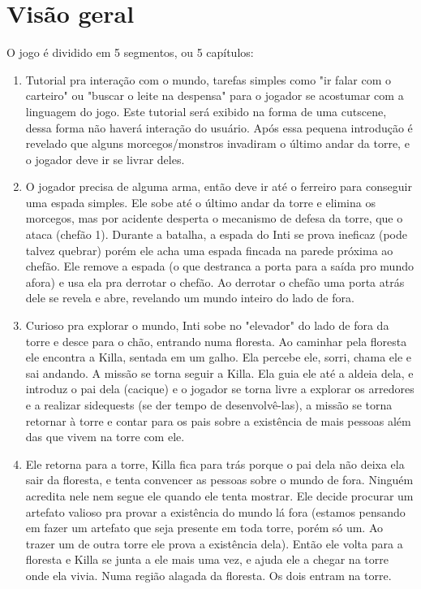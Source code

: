 \documentclass[12pt]{article}
\begin{document}
\section{Visão geral}
O jogo é dividido em 5 segmentos, ou 5 capítulos:
\begin{enumerate}
\item Tutorial pra interação com o mundo, tarefas simples como "ir falar com o
carteiro" ou "buscar o leite na despensa" para o jogador se acostumar com a
linguagem do jogo. Este tutorial será exibido na forma de uma cutscene, dessa
forma não haverá interação do usuário.
Após essa pequena introdução é revelado que alguns morcegos/monstros invadiram
o último andar da torre, e o jogador deve ir se livrar deles.

\item O jogador precisa de alguma arma, então deve ir até o ferreiro para
conseguir uma espada simples. Ele sobe até o último andar da torre e elimina os
morcegos, mas por acidente desperta o mecanismo de defesa da torre, que o ataca
(chefão 1).
Durante a batalha, a espada do Inti se prova ineficaz (pode talvez quebrar)
porém ele acha uma espada fincada na parede próxima ao chefão. Ele remove a
espada (o que destranca a porta para a saída pro mundo afora) e usa ela pra
derrotar o chefão.
Ao derrotar o chefão uma porta atrás dele se revela e abre, revelando um mundo
inteiro do lado de fora.

\item Curioso pra explorar o mundo, Inti sobe no "elevador" do lado de fora da
torre e desce para o chão, entrando numa floresta.
Ao caminhar pela floresta ele encontra a Killa, sentada em um galho. Ela percebe
ele, sorri, chama ele e sai andando. A missão se torna seguir a Killa.
Ela guia ele até a aldeia dela, e introduz o pai dela (cacique) e o jogador se
torna livre a explorar os arredores e a realizar sidequests (se der tempo de
desenvolvê-las), a missão se torna retornar à torre e contar para os pais sobre
a existência de mais pessoas além das que vivem na torre com ele.

\item Ele retorna para a torre, Killa fica para trás porque o pai dela não deixa
ela sair da floresta, e tenta convencer as pessoas sobre o mundo de fora. Ninguém
acredita nele nem segue ele quando ele tenta mostrar. Ele decide procurar um
artefato valioso pra provar a existência do mundo lá fora (estamos pensando em
fazer um artefato que seja presente em toda torre, porém só um. Ao trazer um de
outra torre ele prova a existência dela).
Então ele volta para a floresta e Killa se junta a ele mais uma vez, e ajuda ele
a chegar na torre onde ela vivia. Numa região alagada da floresta. Os dois
entram na torre.


\end{enumerate}
\end{document}
